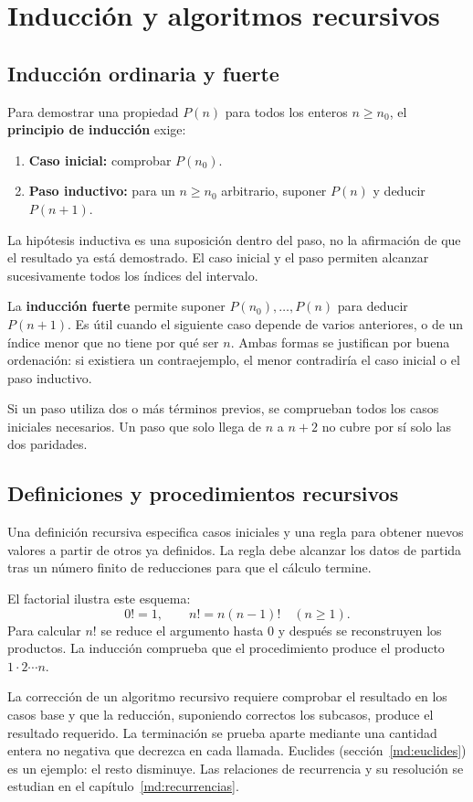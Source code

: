 \chapter{Inducción y algoritmos recursivos}
\label{md:induccion}

\section{Inducción ordinaria y fuerte}

Para demostrar una propiedad $P(n)$ para todos los enteros $n\ge n_0$,
el \textbf{principio de inducción} exige:
\begin{enumerate}
 \item \textbf{Caso inicial:} comprobar $P(n_0)$.
 \item \textbf{Paso inductivo:} para un $n\ge n_0$ arbitrario, suponer
       $P(n)$ y deducir $P(n+1)$.
\end{enumerate}
La hipótesis inductiva es una suposición dentro del paso, no la afirmación
de que el resultado ya está demostrado. El caso inicial y el paso
permiten alcanzar sucesivamente todos los índices del intervalo.

La \textbf{inducción fuerte} permite suponer $P(n_0),\ldots,P(n)$
para deducir $P(n+1)$. Es útil cuando el siguiente caso depende de varios
anteriores, o de un índice menor que no tiene por qué ser $n$.
Ambas formas se justifican por buena ordenación: si existiera un
contraejemplo, el menor contradiría el caso inicial o el paso inductivo.

Si un paso utiliza dos o más términos previos, se comprueban todos
los casos iniciales necesarios. Un paso que solo llega de $n$ a $n+2$
no cubre por sí solo las dos paridades.

\section{Definiciones y procedimientos recursivos}

Una definición recursiva especifica casos iniciales y una regla para
obtener nuevos valores a partir de otros ya definidos.
La regla debe alcanzar los datos de partida tras un número finito de
reducciones para que el cálculo termine.

El factorial ilustra este esquema:
\[
 0!=1,\qquad n!=n(n-1)!\quad(n\ge1).
\]
Para calcular $n!$ se reduce el argumento hasta $0$ y después se
reconstruyen los productos. La inducción comprueba que el procedimiento
produce el producto $1\cdot2\cdots n$.

La corrección de un algoritmo recursivo requiere comprobar el resultado
en los casos base y que la reducción, suponiendo correctos los subcasos,
produce el resultado requerido. La terminación se prueba aparte mediante
una cantidad entera no negativa que decrezca en cada llamada.
Euclides (sección~\ref{md:euclides}) es un ejemplo: el resto disminuye.
Las relaciones de recurrencia y su resolución se estudian en el
capítulo~\ref{md:recurrencias}.

